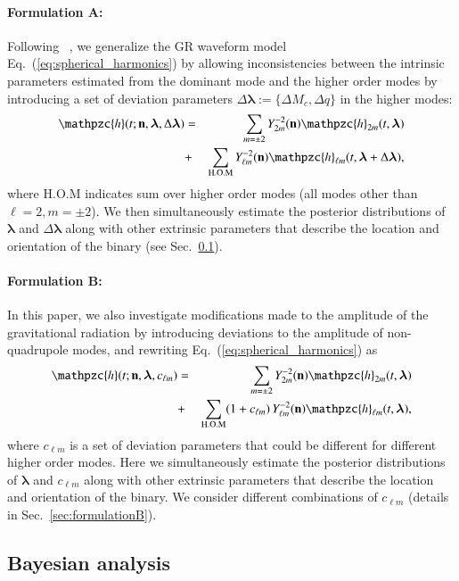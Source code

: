 \documentclass[prd,preprintnumbers,twocolumn,eqsecnum,floatfix,a4paper,nofootinbib,superscriptaddress]{revtex4}
\newcommand{\h}{\mathpzc{h}}
\newcommand{\hlm}{\mathpzc{h}_{\ell m}}
\newcommand{\Ylm}{{Y}^{-2}_{\ell m}}
\newcommand{\blambda}{\bm{\lambda}}
\newcommand{\n}{\mathbf{n}}
\begin{document}
\paragraph{Formulation A:}
	Following ~\cite{Dhanpal:2018ufk}, we generalize the GR waveform model Eq.~(\ref{eq:spherical_harmonics}) by allowing inconsistencies between the intrinsic parameters estimated from the dominant mode and the higher order modes by introducing a set of deviation parameters $\Delta \blambda := \{\Delta M_c, \Delta q\}$ in the higher modes: 
	\begin{eqnarray}
	\h(t; \n, \blambda, \Delta \blambda) & = &    \sum_{m = \pm2} Y^{-2}_{2m} (\n) {\h}_{2m}(t, \blambda) \nonumber \\ 
	& + &  \sum _{\text{H.O.M}} \Ylm (\n) \hlm(t, \blambda+\Delta \blambda), 	
\label{eq:test_1}
	\end{eqnarray}
where {H.O.M} indicates sum over higher order modes (all modes other than $\ell = 2, m = \pm 2$). We then simultaneously estimate the posterior distributions of $\blambda$ and $\Delta \blambda$ along with other extrinsic parameters that describe the location and orientation of the binary (see Sec.~\ref{sec:bayesian_analsysis}). 

\paragraph{Formulation B:}
In this paper, we also investigate modifications made to the amplitude of the gravitational radiation by introducing deviations to the amplitude of non-quadrupole modes, and rewriting Eq.~(\ref{eq:spherical_harmonics}) as
	\begin{eqnarray}
	{\h}(t; \n, \blambda, c_{\ell m}) & = & \sum_{m = \pm2} Y^{-2}_{2m} (\n) {\h}_{2m}(t, \blambda)   \nonumber \\ 
	& + &  \sum _{\text{H.O.M}} (1+{c_{\ell m}}) \, \Ylm (\n) \hlm(t, \blambda) ,
	\label{eq:test_2}
	\end{eqnarray}
	where $c_{\ell m}$ is a set of deviation parameters that could be different for different higher order modes. Here we simultaneously estimate the posterior distributions of $\blambda$ and ${c_{\ell m}}$  along with other extrinsic parameters that describe the location and orientation of the binary. We consider different combinations of ${c_{\ell m}}$ (details in Sec.~\ref{sec:formulationB}). 

\subsection{Bayesian analysis}
\label{sec:bayesian_analsysis}
\end{document}
